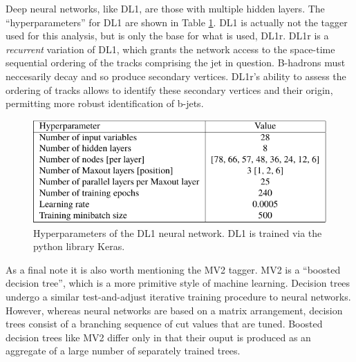             Deep neural networks, like DL1, are those with multiple hidden layers.
            The ``hyperparameters'' for DL1 are shown in Table \ref{tab:DL1_hyperparams}.
            DL1 is actually not the tagger used for this analysis, but is only the base for what is used, DL1r.
            DL1r is a \textit{recurrent} variation of DL1, which grants the network access to the space-time sequential
                ordering of the tracks comprising the jet in question.
            B-hadrons must neccesarily decay and so produce secondary vertices.
            DL1r's ability to assess the ordering of tracks allows to identify these secondary vertices and their origin,
                permitting more robust identification of b-jets.

        
            \begin{figure}[tbh] \center
                \includegraphics[width=0.7\linewidth,height=\textheight,keepaspectratio]{tables/reconstruction/DL1_hyperparams}
                \caption{
                    Hyperparameters of the DL1 neural network\cite{bjet_id_and_performance}.
                    DL1 is trained via the python library Keras.
                }
                \label{tab:DL1_hyperparams}
            \end{figure}

            As a final note it is also worth mentioning the MV2 tagger.
            MV2 is a ``boosted decision tree'', which is a more primitive style of machine learning.
            Decision trees undergo a similar test-and-adjust iterative training procedure to neural networks.
            However, whereas neural networks are based on a matrix arrangement,
                decision trees consist of a branching sequence of cut values that are tuned.
            Boosted decision trees like MV2 differ only in that their ouput is produced as an aggregate of a large number of
                separately trained trees.


